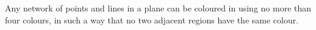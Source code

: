 Any network of points and lines in a plane 
can be coloured in using no more than four colours,
in such a way that no two adjacent regions have the same 
colour.